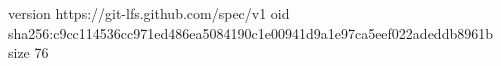 version https://git-lfs.github.com/spec/v1
oid sha256:c9cc114536cc971ed486ea5084190c1e00941d9a1e97ca5eef022adeddb8961b
size 76
